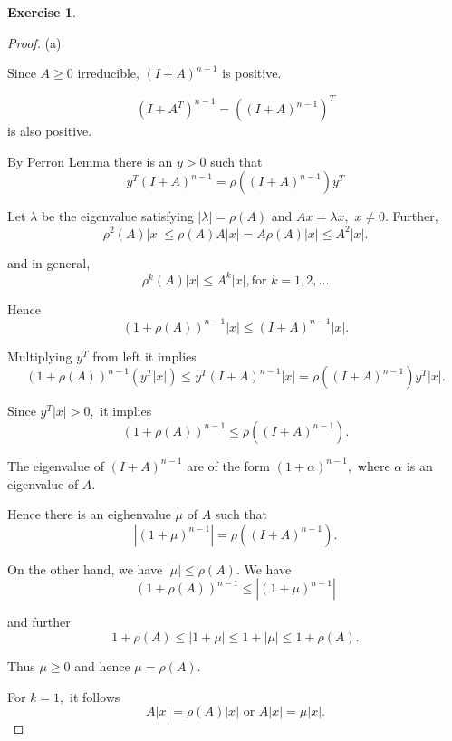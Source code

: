 \documentclass[11pt,a4paper]{article}
\renewcommand{\(}{\left(}
\renewcommand{\)}{\right)}
\newtheorem{exercise}{Exercise}
\begin{document}
  \begin{exercise}
  \end{exercise}  
  \begin{proof}
  	(a)
  	
  	Since $A\geq0$ irreducible, $(I+A)^{n-1}$ is positive.%
  	
  	\[
  	(I+A^{T})^{n-1}=((I+A)^{n-1})^{T}%
  	\]
  	is also positive.
  	
  	By Perron Lemma there is an $y>0$ such that%
  	\[
  	y^{T}(I+A)^{n-1}=\rho((I+A)^{n-1})y^{T}%
  	\]
  	
  	
  	Let $\lambda$ be the eigenvalue satisfying $\left\vert \lambda\right\vert
  	=\rho(A)$ and $Ax=\lambda x,$ $x\neq0.$ Further,%
  	\[
  	\rho^{2}(A)\left\vert x\right\vert \leq\rho(A)A\left\vert x\right\vert
  	=A\rho(A)\left\vert x\right\vert \leq A^{2}\left\vert x\right\vert .
  	\]
  	
  	
  	and in general,%
  	\[
  	\rho^{k}(A)\left\vert x\right\vert \leq A^{k}\left\vert x\right\vert ,\text{
  		for }k=1,2,...
  	\]
  	
  	
  	Hence%
  	\[
  	(1+\rho(A))^{n-1}\left\vert x\right\vert \leq(I+A)^{n-1}\left\vert
  	x\right\vert .
  	\]
  	
  	
  	Multiplying $y^{T}$ from left it implies
  	\[
  	(1+\rho(A))^{n-1}(y^{T}\left\vert x\right\vert )\leq y^{T}(I+A)^{n-1}%
  	\left\vert x\right\vert =\rho((I+A)^{n-1})y^{T}\left\vert x\right\vert .
  	\]
  	
  	
  	Since $y^{T}\left\vert x\right\vert >0,$ it implies%
  	\[
  	(1+\rho(A))^{n-1}\leq\rho((I+A)^{n-1}).
  	\]
  	
  	
  	The eigenvalue of $(I+A)^{n-1}$ are of the form $\left(  1+\alpha\right)
  	^{n-1},$ where $\alpha$ is an eigenvalue of $A.$ 
  	
  	Hence there is an eighenvalue $\mu$ of $A$ such that
  	\[
  	\left\vert (1+\mu)^{n-1}\right\vert =\rho((I+A)^{n-1}).
  	\]
  	
  	
  	On the other hand, we have $\left\vert \mu\right\vert \leq\rho(A).$ We have
  	\[
  	(1+\rho(A))^{n-1}\leq\left\vert (1+\mu)^{n-1}\right\vert
  	\]
  	
  	
  	and further%
  	\[
  	1+\rho(A)\leq\left\vert 1+\mu\right\vert \leq1+\left\vert \mu\right\vert
  	\leq1+\rho(A).
  	\]
  	
  	
  	Thus $\mu\geq0$ and hence $\mu=\rho(A).$
  	
  	For $k=1,$ it follows%
  	\[
  	A\left\vert x\right\vert =\rho(A)\left\vert x\right\vert \text{ or
  	}A\left\vert x\right\vert =\mu\left\vert x\right\vert .
  	\]
  	

\end{proof}
\end{document}
